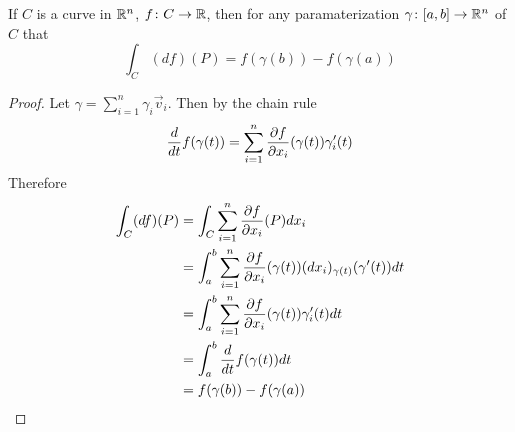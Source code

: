 \documentclass[notes]{subfiles}
\begin{document}
\begin{theorem}
    If $C$ is a curve in $\mathbb{R}^n$, $f\colon C \to \mathbb{R}$, then for any paramaterization $\gamma\colon [a, b] \to \mathbb{R}^n$ of $C$ that
    \[
        \int_C (df)(P) = f(\gamma(b)) - f(\gamma(a))
    \]
\end{theorem}
\begin{proof}
    Let $\gamma = \sum_{i = 1}^n \gamma_i\vec{v}_i$. Then by the chain rule
    \[
        \frac{d}{dt} f(\gamma(t)) = \sum_{i = 1}^n \frac{\partial f}{\partial x_i}(\gamma(t))\gamma'_i(t)
    \]
    Therefore
    \begin{align*}
        \int_C (df)(P)
        &= \int_C \sum_{i = 1}^n \frac{\partial f}{\partial x_i}(P)dx_i \\
        &= \int_a^b \sum_{i = 1}^n \frac{\partial f}{\partial x_i}(\gamma(t))(dx_i)_{\gamma(t)}(\gamma'(t))dt \\
        &= \int_a^b \sum_{i = 1}^n \frac{\partial f}{\partial x_i}(\gamma(t)) \gamma'_i(t) dt \\
        &= \int_a^b \frac{d}{dt}f(\gamma(t))dt \\
        &= f(\gamma(b)) - f(\gamma(a))
    \end{align*}
\end{proof}
\end{document}
